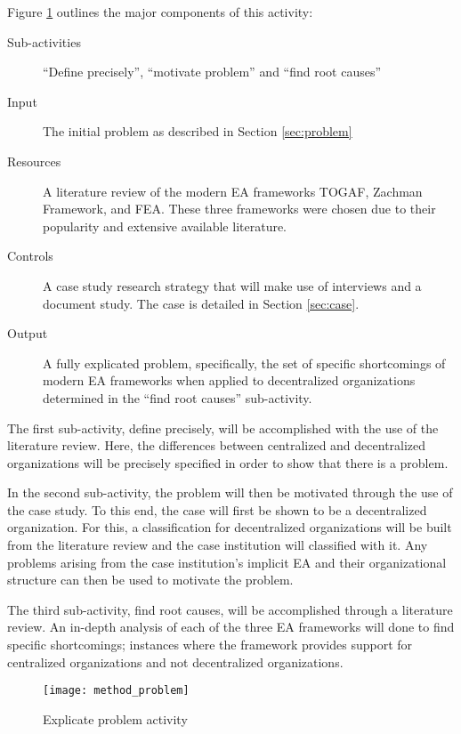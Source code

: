 Figure \ref{fig:method_problem} outlines the major components of this activity:
\begin{description}
  \item[Sub-activities] ``Define precisely'', ``motivate problem'' and ``find root causes''~\cite[Ch. 5]{johannessonPerjons2012}
  \item[Input] The initial problem as described in Section \ref{sec:problem}
  \item[Resources] A literature review of the modern EA frameworks TOGAF, Zachman Framework, and FEA. These three frameworks were chosen due to their popularity and extensive available literature.
  \item[Controls] A case study research strategy that will make use of interviews and a document study. The case is detailed in Section \ref{sec:case}. 
  \item[Output] A fully explicated problem, specifically, the set of specific shortcomings of modern EA frameworks when applied to decentralized organizations determined in the ``find root causes'' sub-activity.
\end{description}

The first sub-activity, define precisely, will be accomplished with the use of the literature review. Here, the differences between centralized and decentralized  organizations will be precisely specified in order to show that there is a problem. 

In the second sub-activity, the problem will then be motivated through the use of the case study. To this end, the case will first be shown to be a decentralized organization. For this, a classification for decentralized organizations will be built from the literature review and the case institution will classified with it. Any problems arising from the case institution's implicit EA and their organizational structure can then be used to motivate the problem. 

The third sub-activity, find root causes, will be accomplished through a literature review. An in-depth analysis of each of the three EA frameworks will done to find specific shortcomings; instances where the framework provides support for centralized organizations and not decentralized organizations. 

\begin{figure}
\centering
\texttt{[image: method\_problem]}
\caption{Explicate problem activity}
\label{fig:method_problem}
\end{figure}

